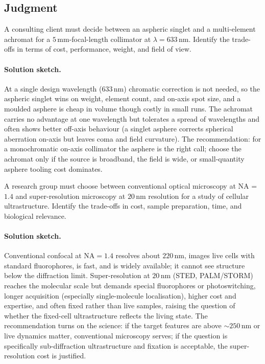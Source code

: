 \subsection*{Judgment}

\begin{exercise}
A consulting client must decide between an aspheric singlet and a
multi-element achromat for a $5\,\si{\milli\meter}$-focal-length
collimator at $\lambda = 633\,\si{\nano\meter}$. Identify the trade-
offs in terms of cost, performance, weight, and field of view.
\paragraph{Solution sketch.} At a single design wavelength
($633\,\si{\nano\meter}$) chromatic correction is not needed, so the
aspheric singlet wins on weight, element count, and on-axis spot size,
and a moulded asphere is cheap in volume though costly in small runs.
The achromat carries no advantage at one wavelength but tolerates a
spread of wavelengths and often shows better off-axis behaviour (a
singlet asphere corrects spherical aberration on-axis but leaves coma
and field curvature). The recommendation: for a monochromatic on-axis
collimator the asphere is the right call; choose the achromat only if
the source is broadband, the field is wide, or small-quantity asphere
tooling cost dominates.
\end{exercise}

\begin{exercise}
A research group must choose between conventional optical microscopy
at NA = $1.4$ and super-resolution microscopy at $20\,\si{\nano
\meter}$ resolution for a study of cellular ultrastructure. Identify
the trade-offs in cost, sample preparation, time, and biological
relevance.
\paragraph{Solution sketch.} Conventional confocal at $\text{NA} = 1.4$
resolves about $220\,\si{\nano\meter}$, images live cells with standard
fluorophores, is fast, and is widely available; it cannot see structure
below the diffraction limit. Super-resolution at $20\,\si{\nano\meter}$
(STED, PALM/STORM) reaches the molecular scale but demands special
fluorophores or photoswitching, longer acquisition (especially
single-molecule localisation), higher cost and expertise, and often
fixed rather than live samples, raising the question of whether the
fixed-cell ultrastructure reflects the living state. The recommendation
turns on the science: if the target features are above
$\sim 250\,\si{\nano\meter}$ or live dynamics matter, conventional
microscopy serves; if the question is specifically sub-diffraction
ultrastructure and fixation is acceptable, the super-resolution cost is
justified.
\end{exercise}

